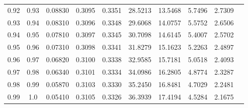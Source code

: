 \documentclass[10pt]{amsart}
\theoremstyle{definition}
\numberwithin{equation}{section}
\begin{document}
\begin{table}[h!]
\begin{tabular}{cccccccccc}
0.92 & 0.93 & 0.08830 & 0.3095 & 0.3351 & 28.5213 & 13.5468 & 5.7496 & 2.7309 \\
0.93 & 0.94 & 0.08310 & 0.3096 & 0.3348 & 29.6068 & 14.0757 & 5.5752 & 2.6506 \\
0.94 & 0.95 & 0.07810 & 0.3097 & 0.3345 & 30.7098 & 14.6145 & 5.4007 & 2.5702 \\
0.95 & 0.96 & 0.07310 & 0.3098 & 0.3341 & 31.8279 & 15.1623 & 5.2263 & 2.4897 \\
0.96 & 0.97 & 0.06820 & 0.3100 & 0.3338 & 32.9585 & 15.7181 & 5.0518 & 2.4093 \\
0.97 & 0.98 & 0.06340 & 0.3101 & 0.3334 & 34.0986 & 16.2805 & 4.8774 & 2.3287 \\
0.98 & 0.99 & 0.05870 & 0.3103 & 0.3330 & 35.2450 & 16.8481 & 4.7029 & 2.2481 \\
0.99 & 1.0 & 0.05410 & 0.3105 & 0.3326 & 36.3939 & 17.4194 & 4.5284 & 2.1675 \\
\hline
\end{tabular}


\end{table}
\end{document}
